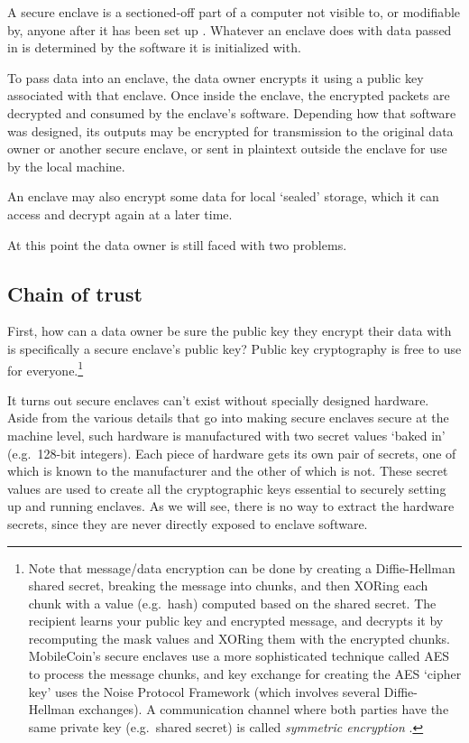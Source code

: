 A secure enclave is a sectioned-off part of a computer not visible to, or modifiable by, anyone after it has been set up \cite{kudelski-sgx-secure-enclaves-review}. Whatever an enclave does with data passed in is determined by the software it is initialized with.

To pass data into an enclave, the data owner encrypts it using a public key associated with that enclave. Once inside the enclave, the encrypted packets are decrypted and consumed by the enclave's software. Depending how that software was designed, its outputs may be encrypted for transmission to the original data owner or another secure enclave, or sent in plaintext outside the enclave for use by the local machine.

An enclave may also encrypt some data for local `sealed' storage, which it can access and decrypt again at a later time.

At this point the data owner is still faced with two problems. 


\subsection{Chain of trust}
\label{subsec:simple-enclaves-chain-of-trust}

First, how can a data owner be sure the public key they encrypt their data with is specifically a secure enclave's public key? Public key cryptography is free to use for everyone.\footnote{Note that message/data encryption can be done by creating a Diffie-Hellman shared secret, breaking the message into chunks, and then XORing each chunk with a value (e.g.\ hash) computed based on the shared secret. The recipient learns your public key and encrypted message, and decrypts it by recomputing the mask values and XORing them with the encrypted chunks. MobileCoin's secure enclaves use a more sophisticated technique called AES \cite{AES-encryption} to process the message chunks, and key exchange for creating the AES `cipher key' uses the Noise Protocol Framework \cite{noise-protocol-framework} (which involves several Diffie-Hellman exchanges). A communication channel where both parties have the same private key (e.g.\ shared secret) is called {\em symmetric encryption} \cite{intel-sgx-explained-advanced}.}

It turns out secure enclaves can't exist without specially designed hardware. Aside from the various details that go into making secure enclaves secure at the machine level, such hardware is manufactured with two secret values `baked in' (e.g.\ 128-bit integers). Each piece of hardware gets its own pair of secrets, one of which is known to the manufacturer and the other of which is not. These secret values are used to create all the cryptographic keys essential to securely setting up and running enclaves. As we will see, there is no way to extract the hardware secrets, since they are never directly exposed to enclave software. \cite{intel-sgx-explained-advanced}

